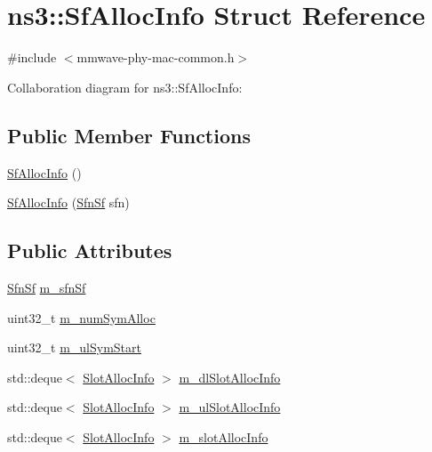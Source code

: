 \hypertarget{structns3_1_1SfAllocInfo}{}\section{ns3\+:\+:Sf\+Alloc\+Info Struct Reference}
\label{structns3_1_1SfAllocInfo}


{\ttfamily \#include $<$mmwave-\/phy-\/mac-\/common.\+h$>$}



Collaboration diagram for ns3\+:\+:Sf\+Alloc\+Info\+:
\subsection*{Public Member Functions}
\begin{DoxyCompactItemize}
\item 
\hyperlink{structns3_1_1SfAllocInfo_afba225e11d16ddd08ae8f8e059c725b1}{Sf\+Alloc\+Info} ()
\item 
\hyperlink{structns3_1_1SfAllocInfo_a77cfa64196981fda6c0224939b42a705}{Sf\+Alloc\+Info} (\hyperlink{structns3_1_1SfnSf}{Sfn\+Sf} sfn)
\end{DoxyCompactItemize}
\subsection*{Public Attributes}
\begin{DoxyCompactItemize}
\item 
\hyperlink{structns3_1_1SfnSf}{Sfn\+Sf} \hyperlink{structns3_1_1SfAllocInfo_a94ce81441772a4663db2051e7fb3e7d7}{m\+\_\+sfn\+Sf}
\item 
uint32\+\_\+t \hyperlink{structns3_1_1SfAllocInfo_a829b7a82e5869efc3f5ac7643006075e}{m\+\_\+num\+Sym\+Alloc}
\item 
uint32\+\_\+t \hyperlink{structns3_1_1SfAllocInfo_afdc93045f3d8e17f1281e3aeae52e4cf}{m\+\_\+ul\+Sym\+Start}
\item 
std\+::deque$<$ \hyperlink{structns3_1_1SlotAllocInfo}{Slot\+Alloc\+Info} $>$ \hyperlink{structns3_1_1SfAllocInfo_ad2ab2d9f0082242c53439c6355607c70}{m\+\_\+dl\+Slot\+Alloc\+Info}
\item 
std\+::deque$<$ \hyperlink{structns3_1_1SlotAllocInfo}{Slot\+Alloc\+Info} $>$ \hyperlink{structns3_1_1SfAllocInfo_af6fbec6da8a071eeb2b2906ce317a710}{m\+\_\+ul\+Slot\+Alloc\+Info}
\item 
std\+::deque$<$ \hyperlink{structns3_1_1SlotAllocInfo}{Slot\+Alloc\+Info} $>$ \hyperlink{structns3_1_1SfAllocInfo_a6a87109ff89bf270a74ff95a5bbf9231}{m\+\_\+slot\+Alloc\+Info}
\end{DoxyCompactItemize}


